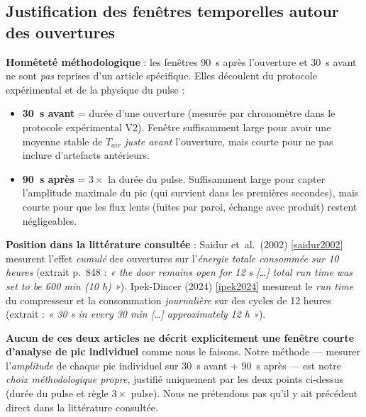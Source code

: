 \documentclass[11pt,a4paper]{article}
\begin{document}
\subsection{Justification des fenêtres temporelles autour des ouvertures}\label{sec:fenetres_porte}

\begin{honnete}
\textbf{Honnêteté méthodologique} : les fenêtres \og \SI{90}{\second} après l'ouverture \fg{}
et \og \SI{30}{\second} avant \fg{} ne sont \emph{pas} reprises d'un article spécifique.
Elles découlent du protocole expérimental et de la physique du pulse :

\begin{itemize}[itemsep=2pt]
\item \textbf{\SI{30}{\second} avant} = durée d'une ouverture (mesurée par chronomètre dans
le protocole expérimental V2). Fenêtre suffisamment large pour avoir une moyenne stable de
$T_{air}$ \emph{juste avant} l'ouverture, mais courte pour ne pas inclure d'artefacts
antérieurs.

\item \textbf{\SI{90}{\second} après} = $3 \times$ la durée du pulse. Suffisamment large
pour capter l'amplitude maximale du pic (qui survient dans les premières secondes), mais
courte pour que les flux \og lents \fg{} (fuites par paroi, échange avec produit) restent
négligeables.
\end{itemize}

\textbf{Position dans la littérature consultée} : Saidur et~al.\ (2002) \ref{saidur2002}
mesurent l'effet \emph{cumulé} des ouvertures sur l'\emph{énergie totale consommée sur
10 heures} (extrait p.~848 : \emph{« the door remains open for 12 s [\dots] total run
time was set to be 600 min (10 h) »}). Ipek-Dincer (2024) \ref{ipek2024} mesurent
le \emph{run time} du compresseur et la consommation \emph{journalière} sur des cycles
de 12 heures (extrait : \emph{« 30 s in every 30 min [\dots] approximately 12 h »}).

\textbf{Aucun de ces deux articles ne décrit explicitement une fenêtre courte
d'analyse de pic individuel} comme nous le faisons. Notre méthode — mesurer
l'\emph{amplitude} de chaque pic individuel sur \SI{30}{\second} avant + \SI{90}{\second}
après — est notre \emph{choix méthodologique propre}, justifié uniquement par les deux
points ci-dessus (durée du pulse et règle $3\times$ pulse). Nous ne prétendons pas qu'il
y ait précédent direct dans la littérature consultée.
\end{honnete}
\end{document}
